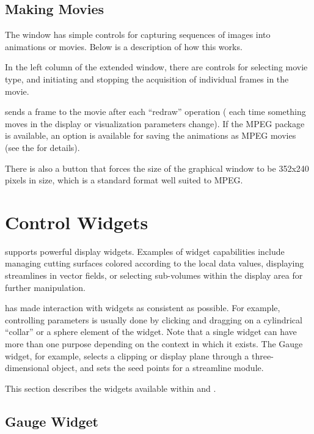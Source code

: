 \subsection{Making Movies}
\label{sec:view-movies} 

The \SR{} \viewer{} window has simple controls for capturing sequences
of images into animations or movies.  Below is a description of how this works.

In the left column of the extended \viewer{} window, there are controls for
selecting movie type, and initiating and stopping the acquisition of
individual frames in the movie.

\SR{} sends a frame to the movie after each ``redraw'' operation (
\ie{} each time something moves in the display or visualization
parameters change).  If the MPEG package is available, an option is
available for saving the animations as MPEG movies (see the
 for
details).

There is also a button that forces the size of the graphical window to be
352x240 pixels in size, which is a standard format well suited to MPEG.

\section{Control Widgets}
\label{sec:view-widgets} 

\SR{} supports powerful display widgets.  Examples of widget
capabilities include managing cutting surfaces colored according to
the local data values, displaying streamlines in vector fields, or
selecting sub-volumes within the display area for further
manipulation.
 
\sci{} has made interaction with widgets as consistent as
possible. For example, controlling parameters is usually done by
clicking and dragging on a cylindrical ``collar'' or a sphere element
of the widget. Note that a single widget can have more than one
purpose depending on the context in which it exists. The Gauge widget,
for example, selects a clipping or display plane through a
three-dimensional object, and sets the seed points for a streamline
module.

This section describes the widgets available within \SR{} and \BIOPSE{}.
 
\subsection{Gauge Widget}
\label{sec:view-gaugewidget} 

